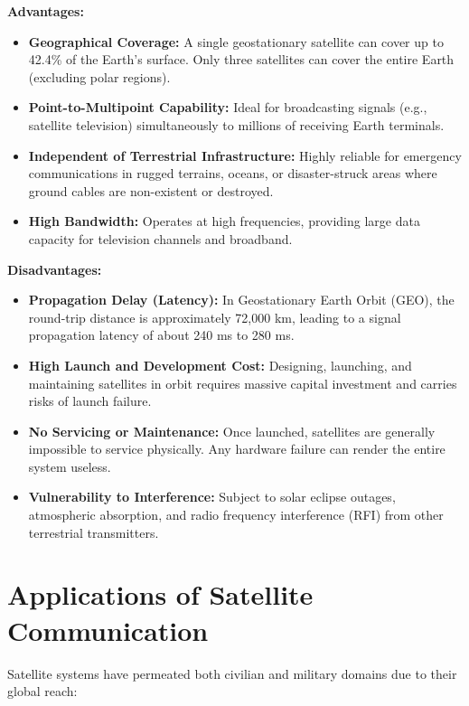 \documentclass[12pt,a4paper]{article}
\begin{document}
\textbf{Advantages:}
\begin{itemize}[leftmargin=*, itemsep=3pt]
  \item \textbf{Geographical Coverage:} A single geostationary satellite can cover up to 42.4\% of the Earth's surface. Only three satellites can cover the entire Earth (excluding polar regions).
  \item \textbf{Point-to-Multipoint Capability:} Ideal for broadcasting signals (e.g., satellite television) simultaneously to millions of receiving Earth terminals.
  \item \textbf{Independent of Terrestrial Infrastructure:} Highly reliable for emergency communications in rugged terrains, oceans, or disaster-struck areas where ground cables are non-existent or destroyed.
  \item \textbf{High Bandwidth:} Operates at high frequencies, providing large data capacity for television channels and broadband.
\end{itemize}

\textbf{Disadvantages:}
\begin{itemize}[leftmargin=*, itemsep=3pt]
  \item \textbf{Propagation Delay (Latency):} In Geostationary Earth Orbit (GEO), the round-trip distance is approximately 72,000 km, leading to a signal propagation latency of about 240 ms to 280 ms.
  \item \textbf{High Launch and Development Cost:} Designing, launching, and maintaining satellites in orbit requires massive capital investment and carries risks of launch failure.
  \item \textbf{No Servicing or Maintenance:} Once launched, satellites are generally impossible to service physically. Any hardware failure can render the entire system useless.
  \item \textbf{Vulnerability to Interference:} Subject to solar eclipse outages, atmospheric absorption, and radio frequency interference (RFI) from other terrestrial transmitters.
\end{itemize}

\section{Applications of Satellite Communication}

Satellite systems have permeated both civilian and military domains due to their global reach:
\end{document}
